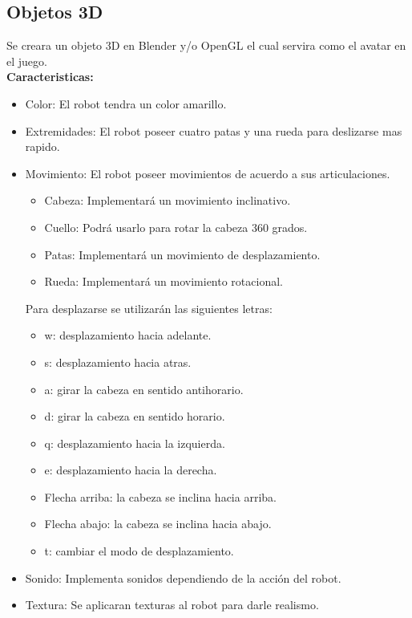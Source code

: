 \documentclass[a4paper]{article}
\begin{document}
\subsection{Objetos 3D}
Se creara un objeto 3D en Blender y/o OpenGL el cual servira como el avatar en el juego.\\
\textbf{Caracteristicas:}
\begin{itemize}
\item Color: El robot tendra un color amarillo.
\item Extremidades: El robot poseer cuatro patas y una rueda para deslizarse mas rapido.
\item Movimiento: El robot poseer movimientos de acuerdo a sus articulaciones.
	\begin{itemize}
		\item Cabeza: Implementará un movimiento inclinativo.
		\item Cuello: Podrá usarlo para rotar la cabeza 360 grados.
		\item Patas: Implementará un movimiento de desplazamiento.
		\item Rueda: Implementará un movimiento rotacional.
		
	\end{itemize}
	Para desplazarse se utilizarán las siguientes letras:
		\begin{itemize}
			\item w: desplazamiento hacia adelante.
			\item s: desplazamiento hacia atras.
			\item a: girar la cabeza en sentido antihorario.
			\item d: girar la cabeza en sentido horario.
			\item q: desplazamiento hacia la izquierda.
			\item e: desplazamiento hacia la derecha.
			\item Flecha arriba: la cabeza se inclina hacia arriba. 
			\item Flecha abajo: la cabeza se inclina hacia abajo.
			\item t: cambiar el modo de desplazamiento.
			
		\end{itemize}
\item Sonido: Implementa sonidos dependiendo de la acción del robot.
\item Textura: Se aplicaran texturas al robot para darle realismo.

\end{itemize}
\end{document}
